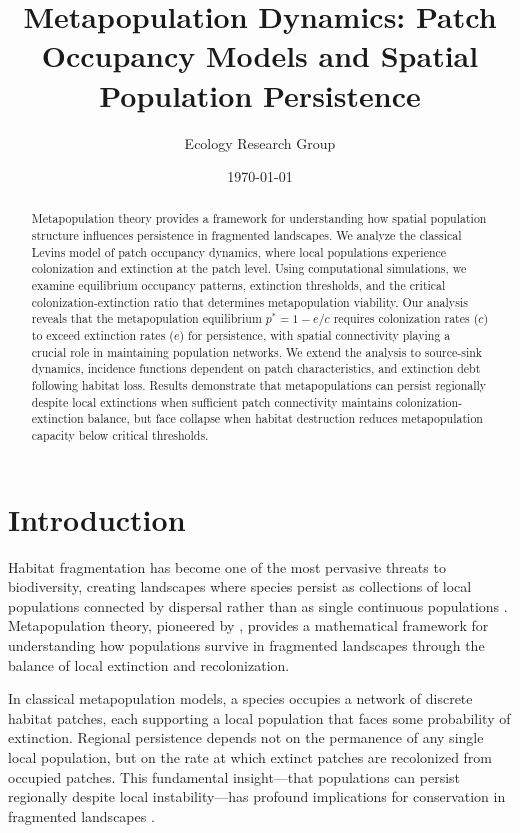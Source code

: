 \documentclass[11pt,a4paper]{article}
\title{Metapopulation Dynamics: Patch Occupancy Models and Spatial Population Persistence}
\author{Ecology Research Group}
\date{\today}
\begin{document}
\maketitle

\begin{abstract}
Metapopulation theory provides a framework for understanding how spatial population structure influences persistence in fragmented landscapes. We analyze the classical Levins model of patch occupancy dynamics, where local populations experience colonization and extinction at the patch level. Using computational simulations, we examine equilibrium occupancy patterns, extinction thresholds, and the critical colonization-extinction ratio that determines metapopulation viability. Our analysis reveals that the metapopulation equilibrium $p^* = 1 - e/c$ requires colonization rates ($c$) to exceed extinction rates ($e$) for persistence, with spatial connectivity playing a crucial role in maintaining population networks. We extend the analysis to source-sink dynamics, incidence functions dependent on patch characteristics, and extinction debt following habitat loss. Results demonstrate that metapopulations can persist regionally despite local extinctions when sufficient patch connectivity maintains colonization-extinction balance, but face collapse when habitat destruction reduces metapopulation capacity below critical thresholds.
\end{abstract}

\section{Introduction}

Habitat fragmentation has become one of the most pervasive threats to biodiversity, creating landscapes where species persist as collections of local populations connected by dispersal rather than as single continuous populations \citep{hanski1999metapopulation, fahrig2003effects}. Metapopulation theory, pioneered by \citet{levins1969some}, provides a mathematical framework for understanding how populations survive in fragmented landscapes through the balance of local extinction and recolonization.

In classical metapopulation models, a species occupies a network of discrete habitat patches, each supporting a local population that faces some probability of extinction. Regional persistence depends not on the permanence of any single local population, but on the rate at which extinct patches are recolonized from occupied patches. This fundamental insight—that populations can persist regionally despite local instability—has profound implications for conservation in fragmented landscapes \citep{hanski1998metapopulation}.
\end{document}
